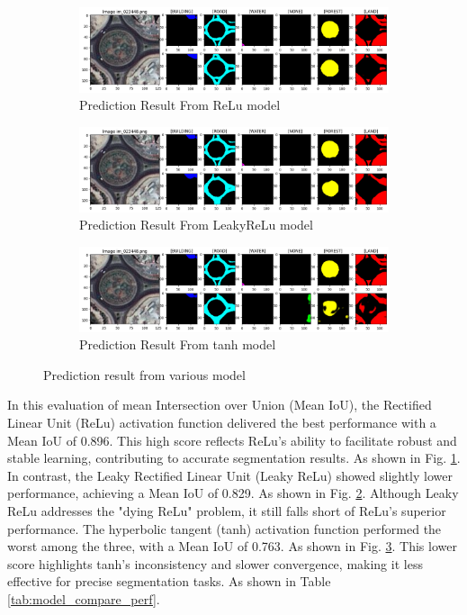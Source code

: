 \documentclass[conference]{IEEEtran}
\begin{document}
\begin{figure}[h!]
    \centering
    \begin{subfigure}[b]{\textwidth}
        \centering
        \includegraphics[width=\textwidth]{relu_5000.png} 
        \caption{Prediction Result From ReLu model}
        \label{fig:res_relu}
    \end{subfigure}
    \begin{subfigure}[b]{\textwidth}
        \centering
        \includegraphics[width=\textwidth]{leaky_5000.png} 
        \caption{Prediction Result From LeakyReLu model}
        \label{fig:res_leaky}
    \end{subfigure}
    \begin{subfigure}[b]{\textwidth}
        \centering
        \includegraphics[width=\textwidth]{tanh_5000.png} %
        \caption{Prediction Result From tanh model}
        \label{fig:res_tanh}
    \end{subfigure}
    \caption{Prediction result from various model}
    \label{fig:multiple}
\end{figure}

In this evaluation of mean Intersection over Union (Mean IoU), the Rectified Linear Unit (ReLu) activation function delivered the best performance with a Mean IoU of 0.896. This high score reflects ReLu's ability to facilitate robust and stable learning, contributing to accurate segmentation results. As shown in Fig. \ref{fig:res_relu}. In contrast, the Leaky Rectified Linear Unit (Leaky ReLu) showed slightly lower performance, achieving a Mean IoU of 0.829. As shown in Fig. \ref{fig:res_leaky}. Although Leaky ReLu addresses the "dying ReLu" problem, it still falls short of ReLu's superior performance. The hyperbolic tangent (tanh) activation function performed the worst among the three, with a Mean IoU of 0.763. As shown in Fig. \ref{fig:res_tanh}. This lower score highlights tanh's inconsistency and slower convergence, making it less effective for precise segmentation tasks. As shown in Table \ref{tab:model_compare_perf}.
\end{document}
